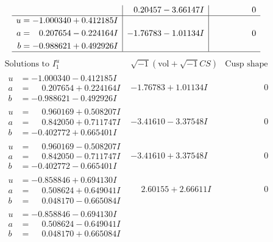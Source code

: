 \documentclass[1p]{elsarticle_modified}
\theoremstyle{definition}
\newcommand{\I}{\sqrt{-1}}
\begin{document}
$$\begin{array}{c|c|c}
 & \phantom{-}0.20457 - 3.66147 I & \phantom{-0.000000 } 0 \\ \hline\begin{aligned}
u &= -1.000340 + 0.412185 I \\
a &= \phantom{-}0.207654 - 0.224164 I \\
b &= -0.988621 + 0.492926 I\end{aligned}
 & -1.76783 - 1.01134 I & \phantom{-0.000000 } 0\\
 \hline 
 \end{array}$$\newpage$$\begin{array}{c|c|c}  
\text{Solutions to }I^u_{1}& \I (\text{vol} + \sqrt{-1}CS) & \text{Cusp shape}\\
 \hline 
\begin{aligned}
u &= -1.000340 - 0.412185 I \\
a &= \phantom{-}0.207654 + 0.224164 I \\
b &= -0.988621 - 0.492926 I\end{aligned}
 & -1.76783 + 1.01134 I & \phantom{-0.000000 } 0 \\ \hline\begin{aligned}
u &= \phantom{-}0.960169 + 0.508207 I \\
a &= \phantom{-}0.842050 + 0.711747 I \\
b &= -0.402772 + 0.665401 I\end{aligned}
 & -3.41610 - 3.37548 I & \phantom{-0.000000 } 0 \\ \hline\begin{aligned}
u &= \phantom{-}0.960169 - 0.508207 I \\
a &= \phantom{-}0.842050 - 0.711747 I \\
b &= -0.402772 - 0.665401 I\end{aligned}
 & -3.41610 + 3.37548 I & \phantom{-0.000000 } 0 \\ \hline\begin{aligned}
u &= -0.858846 + 0.694130 I \\
a &= \phantom{-}0.508624 + 0.649041 I \\
b &= \phantom{-}0.048170 - 0.665084 I\end{aligned}
 & \phantom{-}2.60155 + 2.66611 I & \phantom{-0.000000 } 0 \\ \hline\begin{aligned}
u &= -0.858846 - 0.694130 I \\
a &= \phantom{-}0.508624 - 0.649041 I \\
b &= \phantom{-}0.048170 + 0.665084 I\end{aligned}

\end{array}$$
\end{document}
